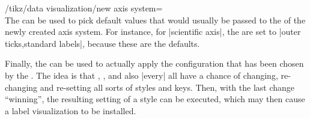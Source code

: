 \begin{key}{/tikz/data visualization/new axis system=\\ %
}
    The  can be used to pick default values that would
    usually be passed to the  of the newly created axis system.
    For instance, for |scientific axis|, the  are set to
    |outer ticks,standard labels|, because these are the defaults.

    Finally, the  can be used to actually apply the
    configuration that has been chosen by the . The idea is that
    , , and also |every|  all have a chance of changing, re-changing and re-setting all sorts
    of styles and keys. Then, with the last change ``winning'', the resulting
    setting of a style can be executed, which may then cause a label
    visualization to be installed.
\end{key}
